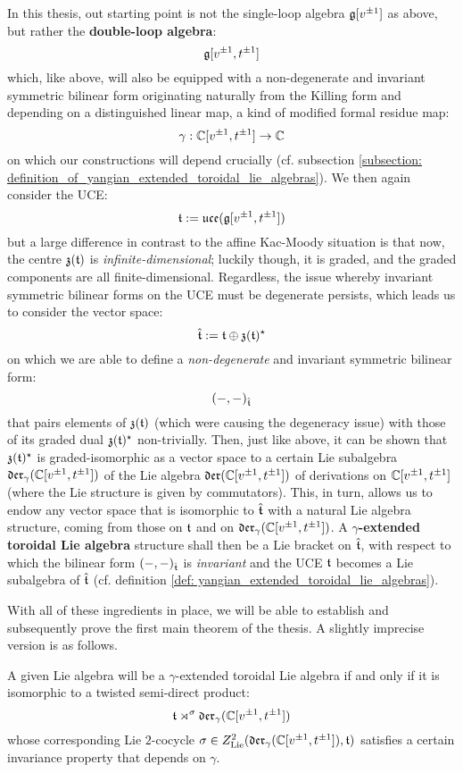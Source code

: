         In this thesis, out starting point is not the single-loop algebra $\mathfrak{g}[v^{\pm 1}]$ as above, but rather the \textbf{double-loop algebra}:
            $$\mathfrak{g}[v^{\pm 1}, t^{\pm 1}]$$
        which, like above, will also be equipped with a non-degenerate and invariant symmetric bilinear form originating naturally from the Killing form and depending on a distinguished linear map, a kind of modified formal residue map:
            $$\gamma: \mathbb{C}[v^{\pm 1}, t^{\pm 1}] \to \mathbb{C}$$
        on which our constructions will depend crucially (cf. subsection \ref{subsection: definition_of_yangian_extended_toroidal_lie_algebras}). We then again consider the UCE:
            $$\mathfrak{t} := \mathfrak{uce}(\mathfrak{g}[v^{\pm 1}, t^{\pm 1}])$$
        but a large difference in contrast to the affine Kac-Moody situation is that now, the centre $\mathfrak{z}(\mathfrak{t})$ is \textit{infinite-dimensional}; luckily though, it is graded, and the graded components are all finite-dimensional. Regardless, the issue whereby invariant symmetric bilinear forms on the UCE must be degenerate persists, which leads us to consider the vector space:
            $$\hat{\mathfrak{t}} := \mathfrak{t} \oplus \mathfrak{z}(\mathfrak{t})^{\star}$$
        on which we are able to define a \textit{non-degenerate} and invariant symmetric bilinear form:
            $$(-, -)_{\hat{\mathfrak{t}}}$$
        that pairs elements of $\mathfrak{z}(\mathfrak{t})$ (which were causing the degeneracy issue) with those of its graded dual $\mathfrak{z}(\mathfrak{t})^{\star}$ non-trivially. Then, just like above, it can be shown that $\mathfrak{z}(\mathfrak{t})^{\star}$ is graded-isomorphic as a vector space to a certain Lie subalgebra $\mathfrak{der}_{\gamma}(\mathbb{C}[v^{\pm 1}, t^{\pm 1}])$ of the Lie algebra $\mathfrak{der}(\mathbb{C}[v^{\pm 1}, t^{\pm 1}])$ of derivations on $\mathbb{C}[v^{\pm 1}, t^{\pm 1}]$ (where the Lie structure is given by commutators). This, in turn, allows us to endow any vector space that is isomorphic to $\hat{\mathfrak{t}}$ with a natural Lie algebra structure, coming from those on $\mathfrak{t}$ and on $\mathfrak{der}_{\gamma}(\mathbb{C}[v^{\pm 1}, t^{\pm 1}])$. A \textbf{$\gamma$-extended toroidal Lie algebra} structure shall then be a Lie bracket on $\hat{\mathfrak{t}}$, with respect to which the bilinear form $(-, -)_{\hat{\mathfrak{t}}}$ is \textit{invariant} and the UCE $\mathfrak{t}$ becomes a Lie subalgebra of $\hat{\mathfrak{t}}$ (cf. definition \ref{def: yangian_extended_toroidal_lie_algebras}).
        
        With all of these ingredients in place, we will be able to establish and subsequently prove the first main theorem of the thesis. A slightly imprecise version is as follows.
        \begin{theorem}
            A given Lie algebra will be a $\gamma$-extended toroidal Lie algebra if and only if it is isomorphic to a twisted semi-direct product:
                $$\mathfrak{t} \rtimes^{\sigma} \mathfrak{der}_{\gamma}(\mathbb{C}[v^{\pm 1}, t^{\pm 1}])$$
            whose corresponding Lie $2$-cocycle $\sigma \in Z^2_{\mathrm{Lie}}(\mathfrak{der}_{\gamma}(\mathbb{C}[v^{\pm 1}, t^{\pm 1}]), \mathfrak{t})$ satisfies a certain invariance property that depends on $\gamma$.
        \end{theorem}

